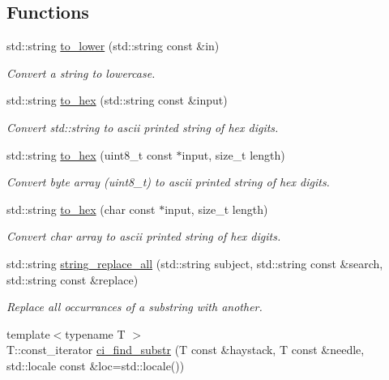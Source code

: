 \subsection*{Functions}
\begin{DoxyCompactItemize}
\item 
std\+::string \hyperlink{namespacewebsocketpp_1_1utility_aa96a743a4f0392aac39742c3e5dfd1cc}{to\+\_\+lower} (std\+::string const \&in)
\begin{DoxyCompactList}\small\item\em Convert a string to lowercase. \end{DoxyCompactList}\item 
std\+::string \hyperlink{namespacewebsocketpp_1_1utility_a26e5a26395d95d2f6bf3a9edb8d06dd2}{to\+\_\+hex} (std\+::string const \&input)
\begin{DoxyCompactList}\small\item\em Convert std\+::string to ascii printed string of hex digits. \end{DoxyCompactList}\item 
std\+::string \hyperlink{namespacewebsocketpp_1_1utility_a42132bbbc1632f7ba964bd87ac5f288f}{to\+\_\+hex} (uint8\+\_\+t const $\ast$input, size\+\_\+t length)
\begin{DoxyCompactList}\small\item\em Convert byte array (uint8\+\_\+t) to ascii printed string of hex digits. \end{DoxyCompactList}\item 
std\+::string \hyperlink{namespacewebsocketpp_1_1utility_a9f9ed51337c9b493abc97b639b0fbe2e}{to\+\_\+hex} (char const $\ast$input, size\+\_\+t length)
\begin{DoxyCompactList}\small\item\em Convert char array to ascii printed string of hex digits. \end{DoxyCompactList}\item 
std\+::string \hyperlink{namespacewebsocketpp_1_1utility_a5d36afd6d8da4b22b5d634e035bfb450}{string\+\_\+replace\+\_\+all} (std\+::string subject, std\+::string const \&search, std\+::string const \&replace)
\begin{DoxyCompactList}\small\item\em Replace all occurrances of a substring with another. \end{DoxyCompactList}\item 
{\footnotesize template$<$typename T $>$ }\\T\+::const\+\_\+iterator \hyperlink{namespacewebsocketpp_1_1utility_a484f1287b93cf58cc6514e46eed41568}{ci\+\_\+find\+\_\+substr} (T const \&haystack, T const \&needle, std\+::locale const \&loc=std\+::locale())

\end{DoxyCompactItemize}
